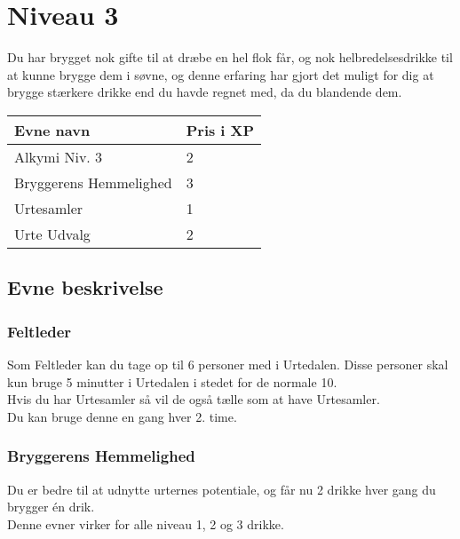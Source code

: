 \chapter*{Niveau 3}
Du har brygget nok gifte til at dræbe en hel flok får, og nok helbredelsesdrikke til at kunne brygge dem i søvne, og denne erfaring har gjort det muligt for dig at brygge stærkere drikke end du havde regnet med, da du blandende dem.

\begin{table}[H]
    \centering
    \begin{tabular}{|p{}|p{}|}
    \rowcolor{cerulean!80}\hline
        Evne navn & Pris i XP \\\hline
        Alkymi Niv. 3 & 2\\\hline
        Bryggerens Hemmelighed & 3\\\hline
        Urtesamler & 1 \\\hline
        Urte Udvalg & 2\\
         \hline
    \end{tabular}
\end{table}
\section*{Evne beskrivelse}




\subsection*{Feltleder}
Som Feltleder kan du tage op til 6 personer med i Urtedalen. Disse personer skal kun bruge 5 minutter i Urtedalen i stedet for de normale 10. \\
Hvis du har Urtesamler så vil de også tælle som at have Urtesamler.\\
Du kan bruge denne en gang hver 2. time.


\subsection*{Bryggerens Hemmelighed}
Du er bedre til at udnytte urternes potentiale, og får nu 2 drikke hver gang du brygger én drik.\\
Denne evner virker for alle niveau 1, 2 og 3 drikke.\\



